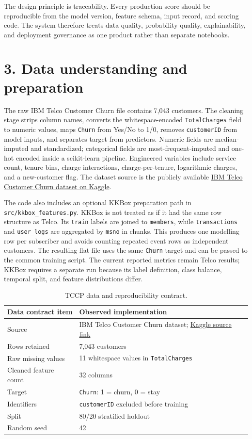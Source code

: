 \documentclass[9pt]{article}
\begin{document}
The design principle is traceability. Every production score should be reproducible from the model version, feature schema, input record, and scoring code. The system therefore treats data quality, probability quality, explainability, and deployment governance as one product rather than separate notebooks.

\section*{3. Data understanding and preparation}
The raw IBM Telco Customer Churn file contains 7,043 customers. The cleaning stage strips column names, converts the whitespace-encoded \texttt{TotalCharges} field to numeric values, maps \texttt{Churn} from Yes/No to 1/0, removes \texttt{customerID} from model inputs, and separates target from predictors. Numeric fields are median-imputed and standardized; categorical fields are most-frequent-imputed and one-hot encoded inside a scikit-learn pipeline. Engineered variables include service count, tenure bins, charge interactions, charge-per-tenure, logarithmic charges, and a new-customer flag. The dataset source is the publicly available \href{https://www.kaggle.com/datasets/blastchar/telco-customer-churn}{IBM Telco Customer Churn dataset on Kaggle}.

The code also includes an optional KKBox preparation path in \texttt{src/kkbox\_features.py}. KKBox is not treated as if it had the same row structure as Telco. Its \texttt{train} labels are joined to \texttt{members}, while \texttt{transactions} and \texttt{user\_logs} are aggregated by \texttt{msno} in chunks. This produces one modelling row per subscriber and avoids counting repeated event rows as independent customers. The resulting flat file uses the same \texttt{Churn} target and can be passed to the common training script. The current reported metrics remain Telco results; KKBox requires a separate run because its label definition, class balance, temporal split, and feature distributions differ.

\begin{table}[!ht]
\centering\small
\begin{tabular}{ll}
\toprule
\textbf{Data contract item} & \textbf{Observed implementation}\\
\midrule
Source & IBM Telco Customer Churn dataset; \href{https://www.kaggle.com/datasets/blastchar/telco-customer-churn}{Kaggle source link}\\
Rows retained & 7,043 customers\\
Raw missing values & 11 whitespace values in \texttt{TotalCharges}\\
Cleaned feature count & 32 columns\\
Target & \texttt{Churn}: 1 = churn, 0 = stay\\
Identifiers & \texttt{customerID} excluded before training\\
Split & 80/20 stratified holdout\\
Random seed & 42\\
\bottomrule
\end{tabular}
\caption{TCCP data and reproducibility contract.}
\label{tab:data-contract}
\end{table}
\end{document}
